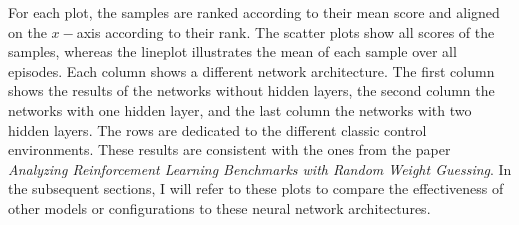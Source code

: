 For each plot, the samples are ranked according to their mean score and aligned on the $x-$axis according to their rank. The scatter plots show all scores of the samples, whereas the lineplot illustrates the mean of each sample over all episodes. Each column shows a different network architecture. The first column shows the results of the networks without hidden layers, the second column the networks with one hidden layer, and the last column the networks with two hidden layers. The rows are dedicated to the different classic control environments. These results are consistent with the ones from the paper \emph{Analyzing Reinforcement Learning Benchmarks with Random Weight Guessing}. In the subsequent sections, I will refer to these plots to compare the effectiveness of other models or configurations to these neural network architectures.

